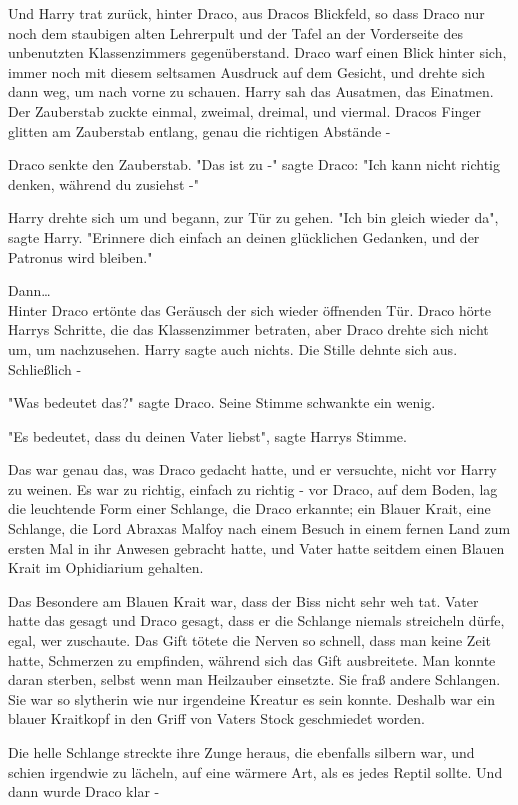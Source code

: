 {Und Harry trat zurück, hinter Draco, aus Dracos Blickfeld, so dass Draco nur noch dem staubigen alten Lehrerpult und der Tafel an der Vorderseite des unbenutzten Klassenzimmers gegenüberstand. Draco warf einen Blick hinter sich, immer noch mit diesem seltsamen Ausdruck auf dem Gesicht, und drehte sich dann weg, um nach vorne zu schauen. Harry sah das Ausatmen, das Einatmen. Der Zauberstab zuckte einmal, zweimal, dreimal, und viermal. Dracos Finger glitten am Zauberstab entlang, genau die richtigen Abstände -

Draco senkte den Zauberstab. "Das ist zu -" sagte Draco: "Ich kann nicht richtig denken, während du zusiehst -"

Harry drehte sich um und begann, zur Tür zu gehen. "Ich bin gleich wieder da", sagte Harry. "Erinnere dich einfach an deinen glücklichen Gedanken, und der Patronus wird bleiben."

Dann…\\ Hinter Draco ertönte das Geräusch der sich wieder öffnenden Tür. Draco hörte Harrys Schritte, die das Klassenzimmer betraten, aber Draco drehte sich nicht um, um nachzusehen. Harry sagte auch nichts. Die Stille dehnte sich aus. Schließlich -

"Was bedeutet das?" sagte Draco. Seine Stimme schwankte ein wenig.

"Es bedeutet, dass du deinen Vater liebst", sagte Harrys Stimme.

Das war genau das, was Draco gedacht hatte, und er versuchte, nicht vor Harry zu weinen. Es war zu richtig, einfach zu richtig - vor Draco, auf dem Boden, lag die leuchtende Form einer Schlange, die Draco erkannte; ein Blauer Krait, eine Schlange, die Lord Abraxas Malfoy nach einem Besuch in einem fernen Land zum ersten Mal in ihr Anwesen gebracht hatte, und Vater hatte seitdem einen Blauen Krait im Ophidiarium gehalten.

Das Besondere am Blauen Krait war, dass der Biss nicht sehr weh tat. Vater hatte das gesagt und Draco gesagt, dass er die Schlange niemals streicheln dürfe, egal, wer zuschaute. Das Gift tötete die Nerven so schnell, dass man keine Zeit hatte, Schmerzen zu empfinden, während sich das Gift ausbreitete. Man konnte daran sterben, selbst wenn man Heilzauber einsetzte. Sie fraß andere Schlangen. Sie war so slytherin wie nur irgendeine Kreatur es sein konnte. Deshalb war ein blauer Kraitkopf in den Griff von Vaters Stock geschmiedet worden.

Die helle Schlange streckte ihre Zunge heraus, die ebenfalls silbern war, und schien irgendwie zu lächeln, auf eine wärmere Art, als es jedes Reptil sollte. Und dann wurde Draco klar -

}
